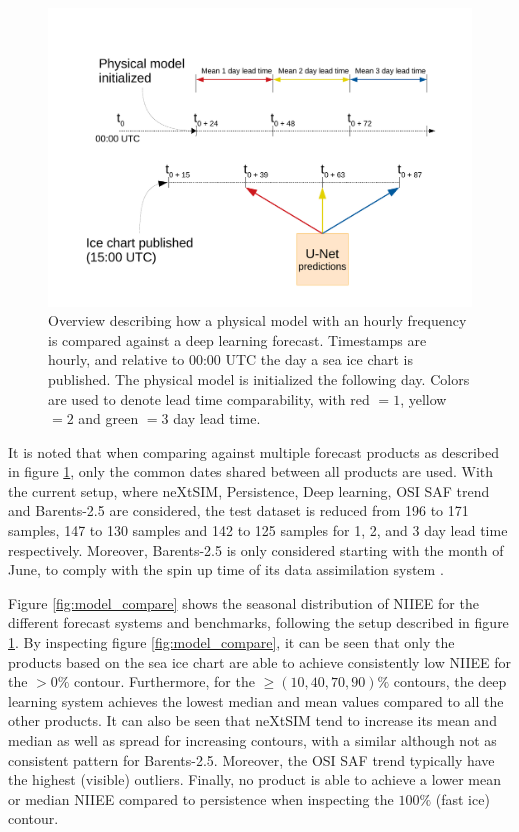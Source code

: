 \documentclass[../main/thesis.tex]{subfiles}
\begin{document}
\begin{figure}
    \centering
    \includegraphics[width=\textwidth]{product_compare_timeline}
    \caption{\label{fig:product_compare_timeline}Overview describing how a physical model with an hourly frequency is compared against a deep learning forecast. Timestamps are hourly, and relative to 00:00 UTC the day a sea ice chart is published. The physical model is initialized the following day. Colors are used to denote lead time comparability, with red $= 1$, yellow $= 2$ and green $= 3$ day lead time.}
\end{figure}

It is noted that when comparing against multiple forecast products as described in figure \ref{fig:product_compare_timeline}, only the common dates shared between all products are used. With the current setup, where neXtSIM, Persistence, Deep learning, OSI SAF trend and Barents-2.5 are considered, the test dataset is reduced from 196 to 171 samples, 147 to 130 samples and 142 to 125 samples for 1, 2, and 3 day lead time respectively. Moreover, Barents-2.5 is only considered starting with the month of June, to comply with the spin up time of its data assimilation system \citep{Roehrs2022}.

Figure \ref{fig:model_compare} shows the seasonal distribution of NIIEE for the different forecast systems and benchmarks, following the setup described in figure \ref{fig:product_compare_timeline}. By inspecting figure \ref{fig:model_compare}, it can be seen that only the products based on the sea ice chart are able to achieve consistently low NIIEE for the $>0\%$ contour. Furthermore, for the $\geq(10, 40, 70, 90)\%$ contours, the deep learning system achieves the lowest median and mean values compared to all the other products. It can also be seen that neXtSIM tend to increase its mean and median as well as spread for increasing contours, with a similar although not as consistent pattern for Barents-2.5. Moreover, the OSI SAF trend typically have the highest (visible) outliers. Finally, no product is able to achieve a lower mean or median NIIEE compared to persistence when inspecting the $100\%$ (fast ice) contour. 
\end{document}
